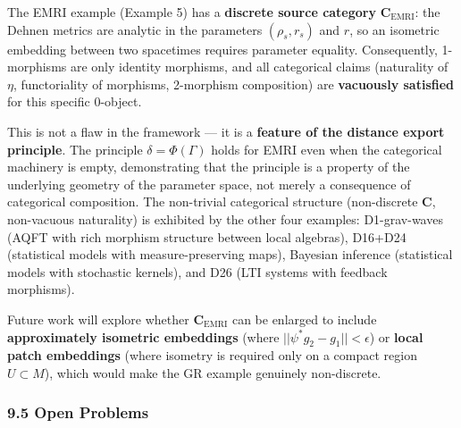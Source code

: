 \documentclass[
]{article}
\begin{document}
The EMRI example (Example 5) has a \textbf{discrete source category}
\(\mathbf{C}_{\text{EMRI}}\): the Dehnen metrics are analytic in the
parameters \((\rho_s, r_s)\) and \(r\), so an isometric embedding
between two spacetimes requires parameter equality. Consequently,
1-morphisms are only identity morphisms, and all categorical claims
(naturality of \(\eta\), functoriality of morphisms, 2-morphism
composition) are \textbf{vacuously satisfied} for this specific
0-object.

This is not a flaw in the framework --- it is a \textbf{feature of the
distance export principle}. The principle \(\delta = \Phi(\Gamma)\)
holds for EMRI even when the categorical machinery is empty,
demonstrating that the principle is a property of the underlying
geometry of the parameter space, not merely a consequence of categorical
composition. The non-trivial categorical structure (non-discrete
\(\mathbf{C}\), non-vacuous naturality) is exhibited by the other four
examples: D1-grav-waves (AQFT with rich morphism structure between local
algebras), D16+D24 (statistical models with measure-preserving maps),
Bayesian inference (statistical models with stochastic kernels), and D26
(LTI systems with feedback morphisms).

Future work will explore whether \(\mathbf{C}_{\text{EMRI}}\) can be
enlarged to include \textbf{approximately isometric embeddings} (where
\(||\psi^* g_2 - g_1|| < \epsilon\)) or \textbf{local patch embeddings}
(where isometry is required only on a compact region \(U \subset M\)),
which would make the GR example genuinely non-discrete.

\subsubsection{9.5 Open Problems}\label{open-problems}
\end{document}
